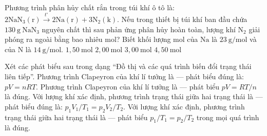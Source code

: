 \begin{ex}
Phương trình phân hủy chất rắn trong túi khí ô tô là: $2\mathrm{NaN_3(r)} \xrightarrow{t^\circ} 2\mathrm{Na(r)} + 3\mathrm{N_2(k)}$. Nếu trong thiết bị túi khí ban đầu chứa $130\ \mathrm{g}\ \mathrm{NaN_3}$ nguyên chất thì sau phản ứng phân hủy hoàn toàn, lượng khí $\mathrm{N_2}$ giải phóng ra ngoài bằng bao nhiêu mol? Biết khối lượng mol của $\mathrm{Na}$ là $23\ \mathrm{g/mol}$ và của $\mathrm{N}$ là $14\ \mathrm{g/mol}$.
\choice
{$1,50\ \mathrm{mol}$}
{$2,00\ \mathrm{mol}$}
{\True $3,00\ \mathrm{mol}$}
{$4,50\ \mathrm{mol}$}
\end{ex}

\begin{ex}
Xét các phát biểu sau trong dạng “Đồ thị và các quá trình biến đổi trạng thái liên tiếp”.
\choiceTF
{\True Phương trình Clapeyron của khí lí tưởng là — phát biểu đúng là: $pV=nRT$.}
{Phương trình Clapeyron của khí lí tưởng là — phát biểu $pV=RT/n$ là đúng.}
{\True Với lượng khí xác định, phương trình trạng thái giữa hai trạng thái là — phát biểu đúng là: $p_1V_1/T_1=p_2V_2/T_2$.}
{Với lượng khí xác định, phương trình trạng thái giữa hai trạng thái là — phát biểu $p_1/T_1=p_2/T_2$ trong mọi quá trình là đúng.}
\end{ex}

